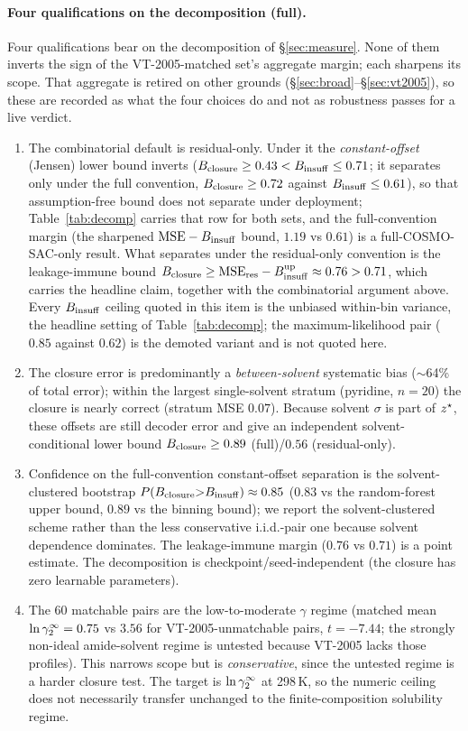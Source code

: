 \paragraph{Four qualifications on the decomposition (full).} Four qualifications bear on the
decomposition of \S\ref{sec:measure}. None of them inverts the sign of the VT-2005-matched set's aggregate
margin; each sharpens its scope. That aggregate is retired on other grounds
(\S\ref{sec:broad}--\S\ref{sec:vt2005}), so these are recorded as what the four choices do and not as
robustness passes for a live verdict.
\begin{enumerate}
  \item The combinatorial default is residual-only. Under it the
  \emph{constant-offset} (Jensen) lower bound inverts
  ($B_{\mathrm{closure}}\ge0.43<B_{\mathrm{insuff}}\le0.71$; it separates only under the full convention,
  $B_{\mathrm{closure}}\ge0.72$ against $B_{\mathrm{insuff}}\le0.61$), so that assumption-free bound does not separate under
  deployment; Table~\ref{tab:decomp} carries that row for both sets, and
  the full-convention margin (the sharpened $\mathrm{MSE}-B_{\mathrm{insuff}}$ bound,
  $1.19$ vs $0.61$) is a full-COSMO-SAC-only result. What separates under the residual-only
  convention is the leakage-immune bound
  $B_{\mathrm{closure}}\ge\mathrm{MSE}_{\mathrm{res}}-B_{\mathrm{insuff}}^{\mathrm{up}}\approx0.76>0.71$, which carries
  the headline claim, together with the combinatorial argument above. Every $B_{\mathrm{insuff}}$ ceiling quoted
  in this item is the unbiased within-bin variance, the headline setting of Table~\ref{tab:decomp};
  the maximum-likelihood pair ($0.85$ against $0.62$) is the demoted variant and is not quoted here.
  \item The closure error is predominantly a \emph{between-solvent}
  systematic bias ($\sim$64\% of total error); within the largest single-solvent stratum
  (pyridine, $n{=}20$) the closure is nearly correct (stratum MSE $0.07$). Because
  solvent $\sigma$ is part of $z^\star$, these offsets are still decoder error and give an
  independent solvent-conditional lower bound $B_{\mathrm{closure}}\ge0.89$ (full)/$0.56$ (residual-only).
  \item Confidence on the full-convention constant-offset
  separation is the solvent-clustered bootstrap $P(B_{\mathrm{closure}}{>}B_{\mathrm{insuff}})\approx0.85$ ($0.83$
  vs the random-forest upper bound, $0.89$ vs the binning bound); we report
  the solvent-clustered scheme rather than the less conservative i.i.d.-pair one because
  solvent dependence dominates. The leakage-immune margin ($0.76$ vs $0.71$) is a
  point estimate. The decomposition is checkpoint/seed-independent (the closure has zero
  learnable parameters).
  \item The 60 matchable pairs are the low-to-moderate $\gamma$
  regime (matched mean $\ln\gamma_2^\infty=0.75$ vs $3.56$ for VT-2005-unmatchable pairs, $t=-7.44$;
  the strongly non-ideal amide-solvent regime is untested because VT-2005 lacks those
  profiles). This narrows scope but is \emph{conservative}, since the untested regime is
  a harder closure test. The target is $\ln\gamma_2^\infty$ at 298\,K, so the numeric ceiling does not
  necessarily transfer unchanged to the finite-composition solubility regime.
\end{enumerate}


